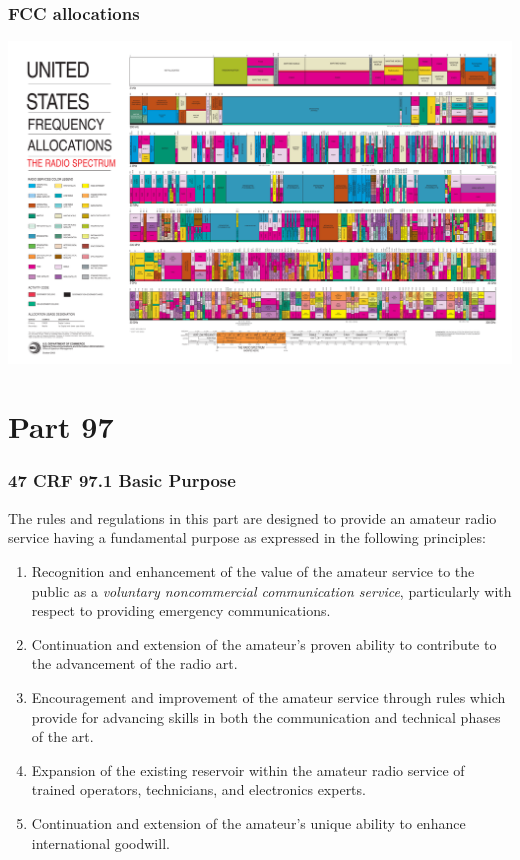 \documentclass[10pt]{beamer}
\begin{document}
\begin{frame}
\frametitle{FCC allocations}
\begin{center}
\includegraphics[width=\textwidth]{2003-allochrt.pdf}
\end{center}
\end{frame}

\section{Part 97}

\begin{frame}
\frametitle{47 CRF 97.1 Basic Purpose}
The rules and regulations in this part are designed to provide an amateur radio service having a fundamental purpose as expressed in the following principles:
\begin{enumerate}[A]
\scriptsize\item  Recognition and enhancement of the value of the amateur service to the public as a \emph{voluntary noncommercial communication service}, particularly with respect to providing emergency communications.\pause
\item Continuation and extension of the amateur's proven ability to contribute to the advancement of the radio art.\pause
\item Encouragement and improvement of the amateur service through rules which provide for advancing skills in both the communication and technical phases of the art.\pause
\item  Expansion of the existing reservoir within the amateur radio service of trained operators, technicians, and electronics experts. \pause
\item Continuation and extension of the amateur's unique ability to enhance international goodwill.
\end{enumerate}
\end{frame}
\end{document}
